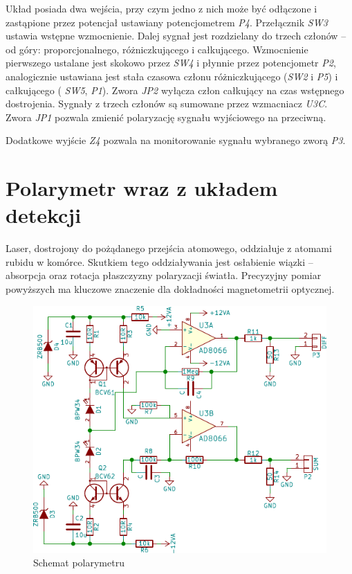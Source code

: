 \documentclass[a4paper,10pt,twoside]{report}
\begin{document}
Układ posiada dwa wejścia, przy czym jedno z nich może być odłączone i zastąpione przez potencjał ustawiany potencjometrem \textit{P4}. Przełącznik \textit{SW3} ustawia wstępne wzmocnienie.
Dalej sygnał jest rozdzielany do trzech członów -- od góry: proporcjonalnego, różniczkującego i całkującego.
Wzmocnienie pierwszego ustalane jest skokowo przez \textit{SW4} i płynnie przez potencjometr \textit{P2}, analogicznie ustawiana jest stała czasowa członu różniczkującego (\textit{SW2} i \textit{P5}) i całkującego ( \textit{SW5}, \textit{P1}). Zwora \textit{JP2} wyłącza człon całkujący na czas wstępnego dostrojenia.
Sygnały z trzech członów są sumowane przez wzmacniacz \textit{U3C}. Zwora \textit{JP1} pozwala zmienić polaryzację sygnału wyjściowego na przeciwną.

Dodatkowe wyjście \textit{Z4} pozwala na monitorowanie sygnału wybranego zworą \textit{P3}.

\section{Polarymetr wraz z układem detekcji}

Laser, dostrojony do pożądanego przejścia atomowego, oddziałuje z atomami rubidu w komórce.
Skutkiem tego oddziaływania jest osłabienie wiązki -- absorpcja oraz rotacja płaszczyzny polaryzacji światła.
Precyzyjny pomiar powyższych ma kluczowe znaczenie dla dokładności magnetometrii optycznej.

\begin{figure}
\begin{center}
 \includegraphics{./obrazki/polarymetr.pdf}
\end{center}
\caption{Schemat polarymetru}
\label{sch-mod}
\end{figure}
\end{document}
